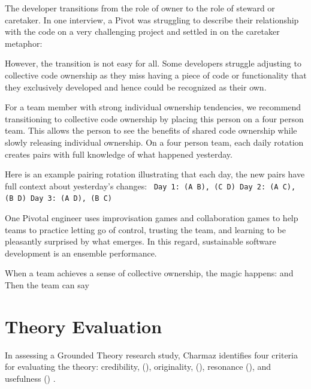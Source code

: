 \begin{table}[]
The developer transitions from the role of owner to the role of steward or caretaker. In one interview, a Pivot was struggling to describe their relationship with the code on a very challenging project and settled in on the caretaker metaphor: 

However, the transition is not easy for all. Some developers struggle adjusting to collective code ownership as they miss having a piece of code or functionality that they exclusively developed and hence could be recognized as their own.

For a team member with strong individual ownership tendencies, we recommend transitioning to collective code ownership by placing this person on a four person team. This allows the person to see the benefits of shared code ownership while slowly releasing individual ownership. On a four person team, each daily rotation creates pairs with full knowledge of what happened yesterday.  

Here is an example pairing rotation illustrating that each day, the new pairs have full context about yesterday's changes:
\texttt{
Day 1: (A B), (C D)
Day 2: (A C), (B D)
Day 3: (A D), (B C)
}

One Pivotal engineer uses improvisation games and collaboration games to help teams to practice letting go of control, trusting the team, and learning to be pleasantly surprised by what emerges. In this regard, sustainable software development is an ensemble performance. 

When a team achieves a sense of collective ownership, the magic happens:  and  Then the team can say 
\section{Theory Evaluation}
\label{TheoryEvaluation}

In assessing a Grounded Theory research study, Charmaz identifies four criteria for evaluating the theory: credibility, (), originality, (), resonance (), and usefulness () \cite{StolGTinSE}. 


\end{table}
